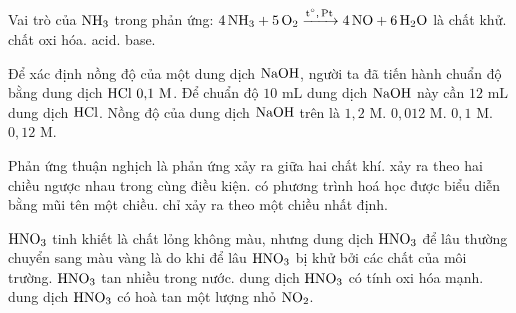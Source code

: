 \documentclass[12pt,a4paper]{article}
\begin{document}
\begin{ex}
Vai trò của $\ce{NH3}$ trong phản ứng: $\ce{4NH3 + 5O2 ->[t^\circ, \text{Pt}] 4NO + 6H2O}$ là
\choice
{\True chất khử.}
{chất oxi hóa.}
{acid.}
{base.}
\end{ex}

\begin{ex}
Để xác định nồng độ của một dung dịch $\ce{NaOH}$, người ta đã tiến hành chuẩn độ bằng dung dịch $\ce{HCl}\ 0{,}1\text{ M}$. Để chuẩn độ $10\text{ mL}$ dung dịch $\ce{NaOH}$ này cần $12\text{ mL}$ dung dịch $\ce{HCl}$. Nồng độ của dung dịch $\ce{NaOH}$ trên là
\choice
{$1{,}2\text{ M}$.}
{$0{,}012\text{ M}$.}
{$0{,}1\text{ M}$.}
{\True $0{,}12\text{ M}$.}
\end{ex}

\begin{ex}
Phản ứng thuận nghịch là phản ứng
\choice
{xảy ra giữa hai chất khí.}
{\True xảy ra theo hai chiều ngược nhau trong cùng điều kiện.}
{có phương trình hoá học được biểu diễn bằng mũi tên một chiều.}
{chỉ xảy ra theo một chiều nhất định.}
\end{ex}

\begin{ex}
$\ce{HNO3}$ tinh khiết là chất lỏng không màu, nhưng dung dịch $\ce{HNO3}$ để lâu thường chuyển sang màu vàng là do
\choice
{khi để lâu $\ce{HNO3}$ bị khử bởi các chất của môi trường.}
{$\ce{HNO3}$ tan nhiều trong nước.}
{dung dịch $\ce{HNO3}$ có tính oxi hóa mạnh.}
{\True dung dịch $\ce{HNO3}$ có hoà tan một lượng nhỏ $\ce{NO2}$.}
\end{ex}
\end{document}
